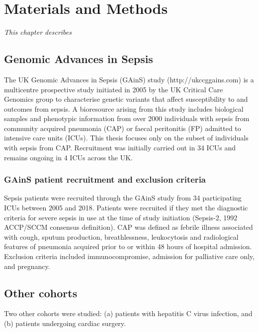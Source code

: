 \chapter{Materials and Methods}
\label{ch:MandM}
\textit{This chapter describes }

\startcontents[chapters]{\vspace{-1.4cm}}
\singlespacing
{}
\doublespacing

\section{Genomic Advances in Sepsis}
The UK Genomic Advances in Sepsis (GAinS) study (http://ukccggains.com) is a multicentre prospective study initiated in 2005 by the UK Critical Care Genomics group to characterise genetic variants that affect susceptibility to and outcomes from sepsis. A bioresource arising from this study includes biological samples and phenotypic information from over 2000 individuals with sepsis from community acquired pneumonia (CAP) or faecal peritonitis (FP) admitted to intensive care units (ICUs). This thesis focuses only on the subset of individuals with sepsis from CAP. Recruitment was initially carried out in 34 ICUs and remains ongoing in 4 ICUs across the UK.

\subsection{GAinS patient recruitment and exclusion criteria}
Sepsis patients were recruited through the GAinS study from 34 participating ICUs between 2005 and 2018. Patients were recruited if they met the diagnostic criteria for severe sepsis in use at the time of study initiation (Sepsis-2, 1992 ACCP/SCCM consensus definition). CAP was defined as febrile illness associated with cough, sputum production, breathlessness, leukocytosis and radiological features of pneumonia acquired prior to or within 48 hours of hospital admission. Exclusion criteria included immunocompromise, admission for palliative care only, and pregnancy.


\section{Other cohorts}
Two other cohorts were studied: (a) patients with hepatitis C virus infection, and (b) patients undergoing cardiac surgery.

